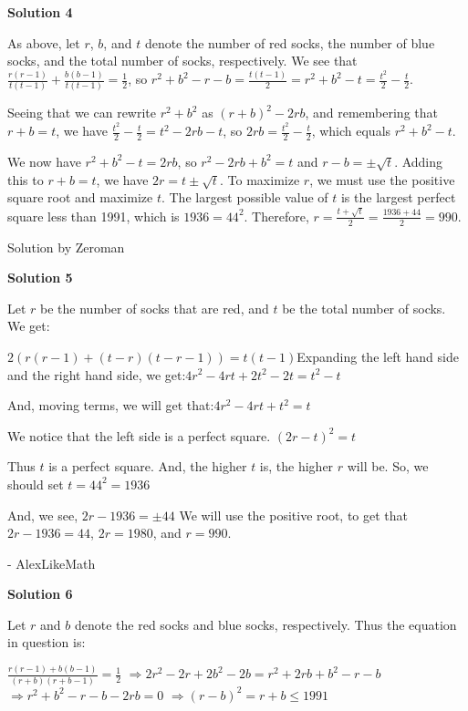 \begin{enumerate}
 



\textbf{Solution 4}

As above, let $r$, $b$, and $t$ denote the number of red socks, the number of blue socks, and the total number of socks, respectively. We see that $\frac{r(r-1)}{t(t-1)}+\frac{b(b-1)}{t(t-1)}=\frac{1}{2}$, so $r^2+b^2-r-b=\frac{t(t-1)}{2}=r^2+b^2-t=\frac{t^2}{2}-\frac{t}{2}$. 

 Seeing that we can rewrite $r^2+b^2$ as $(r+b)^2-2rb$, and remembering that $r+b=t$, we have $\frac{t^2}{2}-\frac{t}{2}=t^2-2rb-t$, so $2rb=\frac{t^2}{2}-\frac{t}{2}$, which equals $r^2+b^2-t$.

 We now have $r^2+b^2-t=2rb$, so $r^2-2rb+b^2=t$ and $r-b=\pm\sqrt{t}$. Adding this to $r+b=t$, we have $2r=t\pm\sqrt{t}$. To maximize $r$, we must use the positive square root and maximize $t$. The largest possible value of $t$ is the largest perfect square less than 1991, which is $1936=44^2$. Therefore, $r=\frac{t+\sqrt{t}}{2}=\frac{1936+44}{2}=\boxed{990}$.

 Solution by Zeroman

 



\textbf{Solution 5}

Let $r$ be the number of socks that are red, and $t$ be the total number of socks. We get:

 $2(r(r-1)+(t-r)(t-r-1))=t(t-1)$Expanding the left hand side and the right hand side, we get:$4r^2-4rt+2t^2-2t = t^2-t$

 And, moving terms, we will get that:$4r^2-4rt+t^2 = t$

 We notice that the left side is a perfect square. $(2r-t)^2 = t$

 Thus $t$ is a perfect square. And, the higher $t$ is, the higher $r$ will be. So, we should set $t = 44^2 = 1936$

 And, we see, $2r-1936 = \pm44$ We will use the positive root, to get that $2r-1936 = 44$, $2r = 1980$, and $r = \boxed{990}$.

 - AlexLikeMath

 



\textbf{Solution 6}

Let $r$ and $b$ denote the red socks and blue socks, respectively. Thus the equation in question is:

 $\frac{r(r-1)+b(b-1)}{(r+b)(r+b-1)}=\frac{1}{2}$
$\Rightarrow 2r^2-2r+2b^2-2b=r^2+2rb+b^2-r-b$
$\Rightarrow r^2+b^2-r-b-2rb=0$
$\Rightarrow (r-b)^2=r+b\le 1991$


\end{enumerate}

